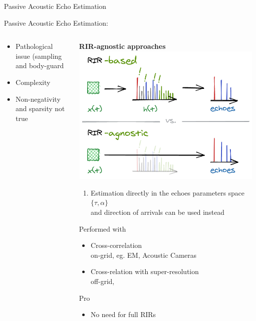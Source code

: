 \begin{frame}{Passive Acoustic Echo Estimation}
\begin{block}{\alert{Passive} Acoustic Echo Estimation:}
\begin{columns}[T,onlytextwidth]
\begin{column}{.48\textwidth}
\begin{itemize}
                    \item Pathological issue (sampling and body-guard
                    \item Complexity
                    \item Non-negativity and sparsity not true
                \end{itemize}
            \end{column}%
            \hfill%
            \begin{column}{.48\textwidth}
                \textbf{RIR-\alert{agnostic} approaches}
                \includegraphics[trim={0 0 0 47em},clip,width=.9\textwidth]{./figures/based-agnostic.png}
                \begin{enumerate}
                    \item Estimation directly in the echoes parameters space $\{\tau,\alpha\}$
                    \\and direction of arrivals can be used instead
                \end{enumerate}
                Performed with
                \begin{itemize}
                    \item Cross-correlation
                    \\on-grid, eg. EM, Acoustic Cameras
                    \item Cross-relation with super-resolution
                    \\off-grid,~\cite{mulan,blaster}
                \end{itemize}
                Pro
                \begin{itemize}
                    \item No need for full RIRs

\end{itemize}
\end{column}
\end{columns}
\end{block}
\end{frame}
